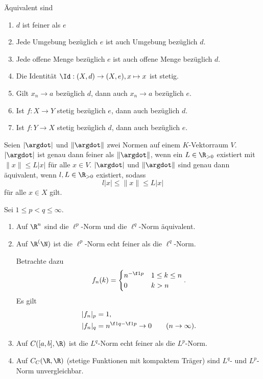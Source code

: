 \begin{prop}
	Äquivalent sind
	\begin{enumerate}[(1)]
		\item
			$d$ ist feiner als $e$
		\item
			Jede Umgebung bezüglich $e$ ist auch Umgebung bezüglich $d$.
		\item
			Jede offene Menge bezüglich $e$ ist auch offene Menge bezüglich $d$.
		\item
			Die Identität $\Id: (X,d) \to (X,e), x \mapsto x$ ist stetig.
		\item
			Gilt $x_n \to a$ bezüglich $d$, dann auch $x_n \to a$ bezüglich $e$.
		\item
			Ist $f: X \to Y$ stetig bezüglich $e$, dann auch bezüglich $d$.
		\item
			Ist $f: Y \to X$ stetig bezüglich $d$, dann auch bezüglich $e$.
	\end{enumerate}
	Seien $|\argdot|$ und $\|\argdot\|$ zwei Normen auf einem $K$-Vektorraum $V$.
	$|\argdot|$ ist genau dann feiner als $\|\argdot\|$, wenn ein $L \in \R_{>0}$ existiert mit $\|x\| \le L |x|$ für alle $x \in V$.
	$|\argdot|$ und $\|\argdot\|$ sind genau dann äquivalent, wenn $l,L \in \R_{>0}$ existiert, sodass
	\[
		l|x| \le \|x\| \le L|x|
	\]
	für alle $x \in X$ gilt.
\end{prop}

\begin{ex}
	Sei $1 \le p < q \le \infty$.
	\begin{enumerate}[(1)]
		\item
			Auf $\R^n$ sind die $\ell^p$-Norm und die $\ell^q$-Norm äquivalent.
		\item
			Auf $\R^(\N)$ ist die $\ell^p$-Norm echt feiner als die $\ell^q$-Norm.

			Betrachte dazu
			\[
				f_n(k) = \begin{cases}
					n^{-\f 1p} & 1 \le k \le n \\
					0 & k > n
				\end{cases}.
			\]
			Es gilt
			\begin{align*}
				|f_n|_p &= 1, \\
				|f_n|_q &= n^{\f 1q-\f 1p} \to 0 \qquad (n\to \infty).
			\end{align*}
		\item
			Auf $C([a,b], \R)$ ist die $L^q$-Norm echt feiner als die $L^p$-Norm.
		\item
			Auf $C_C(\R,\R)$ (stetige Funktionen mit kompaktem Träger) sind $L^q$- und $L^p$-Norm unvergleichbar.
	\end{enumerate}
\end{ex}


